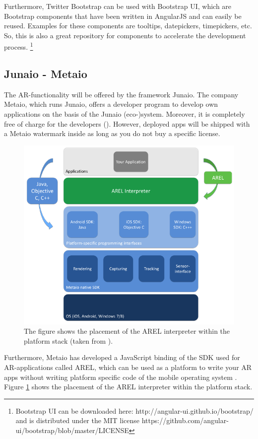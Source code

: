 Furthermore, Twitter Bootstrap can be used with Bootstrap UI, which are Bootstrap components that have been written in AngularJS and can easily be reused. Examples for these components are tooltips, datepickers, timepickers, etc. So, this is also a great repository for components to accelerate the development process. \footnote{Bootstrap UI can be downloaded here: http://angular-ui.github.io/bootstrap/ and is distributed under the MIT license https://github.com/angular-ui/bootstrap/blob/master/LICENSE}

\subsection{Junaio - Metaio}
\label{AREL}
The \ac{AR}-functionality will be offered by the framework Junaio. The company Metaio, which runs Junaio, offers a developer program to develop own applications on the basis of the Junaio (eco-)system. Moreover, it is completely free of charge for the developers (\cite{junaio1}). However, deployed apps will be shipped with a Metaio watermark inside as long as you do not buy a specific license. 

\begin{figure}[th]
\centerline{\includegraphics[width=.7\textwidth]{gfx/stackAREL}}
\caption{The figure shows the placement of the AREL interpreter within the platform stack (taken from \cite{MetaioDEV}).}
\label{stackArel}
\end{figure}

Furthermore, Metaio has developed a JavaScript binding of the SDK used for \ac{AR}-applications called \ac{AREL}, which can be used as a platform to write your \ac{AR} apps without writing platform specific code of the mobile operating system \cite{MetaioDEV}. Figure \ref{stackArel} shows the placement of the \ac{AREL} interpreter within the platform stack. 

